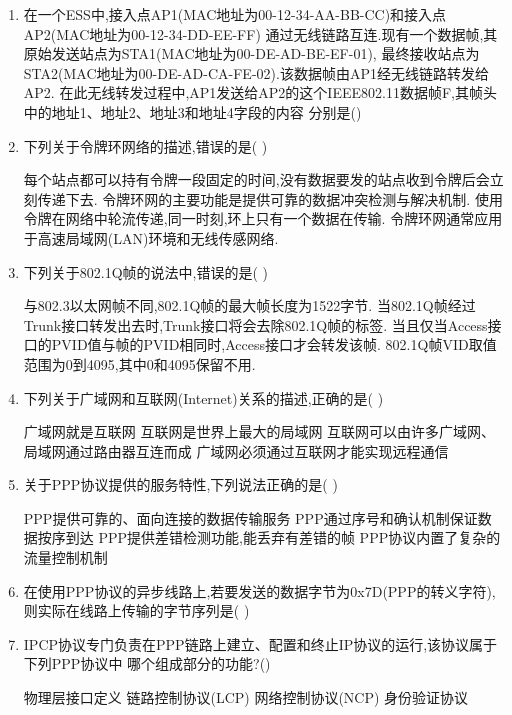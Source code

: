 \documentclass[12pt, a4paper, oneside, UTF8]{ctexbook}
\begin{document}
\begin{enumerate}
    \item 在一个ESS中,接入点AP1(MAC地址为00-12-34-AA-BB-CC)和接入点AP2(MAC地址为00-12-34-DD-EE-FF)
    通过无线链路互连.现有一个数据帧,其原始发送站点为STA1(MAC地址为00-DE-AD-BE-EF-01),
    最终接收站点为STA2(MAC地址为00-DE-AD-CA-FE-02).该数据帧由AP1经无线链路转发给AP2.
    在此无线转发过程中,AP1发送给AP2的这个IEEE802.11数据帧F,其帧头中的地址1、地址2、地址3和地址4字段的内容
    分别是(\qquad)

    \item 下列关于令牌环网络的描述,错误的是( )
    \begin{choices}[1]
    \task 每个站点都可以持有令牌一段固定的时间,没有数据要发的站点收到令牌后会立刻传递下去.
    \task 令牌环网的主要功能是提供可靠的数据冲突检测与解决机制.
    \task 使用令牌在网络中轮流传递,同一时刻,环上只有一个数据在传输.
    \task 令牌环网通常应用于高速局域网(LAN)环境和无线传感网络.
    \end{choices}

    \item 下列关于802.1Q帧的说法中,错误的是( )
    \begin{choices}[1]
    \task 与802.3以太网帧不同,802.1Q帧的最大帧长度为1522字节.
    \task 当802.1Q帧经过Trunk接口转发出去时,Trunk接口将会去除802.1Q帧的标签.
    \task 当且仅当Access接口的PVID值与帧的PVID相同时,Access接口才会转发该帧.
    \task 802.1Q帧VID取值范围为0到4095,其中0和4095保留不用.
    \end{choices}


    \item 下列关于广域网和互联网(Internet)关系的描述,正确的是( )
    \begin{choices}[1]
    \task 广域网就是互联网
    \task 互联网是世界上最大的局域网
    \task 互联网可以由许多广域网、局域网通过路由器互连而成
    \task 广域网必须通过互联网才能实现远程通信
    \end{choices}


    \item 关于PPP协议提供的服务特性,下列说法正确的是( )
    \begin{choices}[1]
    \task PPP提供可靠的、面向连接的数据传输服务
    \task PPP通过序号和确认机制保证数据按序到达
    \task PPP提供差错检测功能,能丢弃有差错的帧
    \task PPP协议内置了复杂的流量控制机制
    \end{choices}


    \item 在使用PPP协议的异步线路上,若要发送的数据字节为0x7D(PPP的转义字符),则实际在线路上传输的字节序列是( )
    \item IPCP协议专门负责在PPP链路上建立、配置和终止IP协议的运行,该协议属于下列PPP协议中
    哪个组成部分的功能?(\qquad)
    \begin{choices}[1]
    \task 物理层接口定义
    \task 链路控制协议(LCP)
    \task 网络控制协议(NCP)
    \task 身份验证协议        
    \end{choices}


\end{enumerate}
\end{document}
